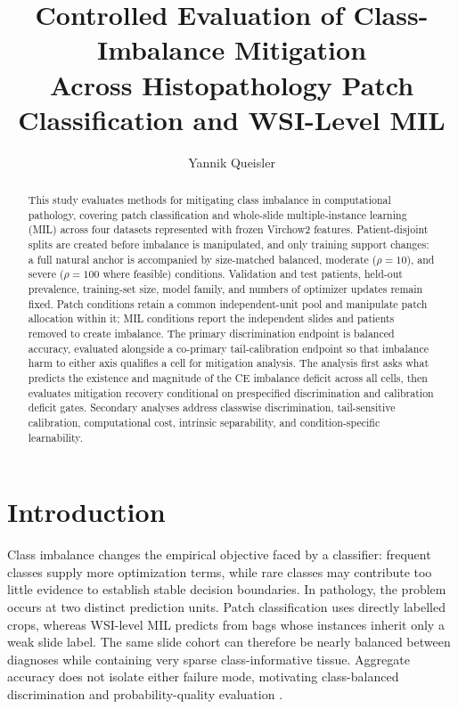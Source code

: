 \documentclass[11pt]{article}
\title{Controlled Evaluation of Class-Imbalance Mitigation\\
Across Histopathology Patch Classification and WSI-Level MIL}
\author{Yannik Queisler}
\date{}
\begin{document}
\maketitle

\begin{abstract}
\begingroup
\setlength{\emergencystretch}{2em}
\noindent This study evaluates methods for mitigating class imbalance in computational pathology, covering patch classification and whole-slide multiple-instance learning (MIL) across four datasets represented with frozen Virchow2 features. Patient-disjoint splits are created before imbalance is manipulated, and only training support changes: a full natural anchor is accompanied by size-matched balanced, moderate ($\rho=10$), and severe ($\rho=100$ where feasible) conditions. Validation and test patients, held-out prevalence, training-set size, model family, and numbers of optimizer updates remain fixed. Patch conditions retain a common independent-unit pool and manipulate patch allocation within it; MIL conditions report the independent slides and patients removed to create imbalance. The primary discrimination endpoint is balanced accuracy, evaluated alongside a co-primary tail-calibration endpoint so that imbalance harm to either axis qualifies a cell for mitigation analysis. The analysis first asks what predicts the existence and magnitude of the CE imbalance deficit across all cells, then evaluates mitigation recovery conditional on prespecified discrimination and calibration deficit gates. Secondary analyses address classwise discrimination, tail-sensitive calibration, computational cost, intrinsic separability, and condition-specific learnability.
\par
\endgroup
\end{abstract}

\setcounter{tocdepth}{2}
\tableofcontents
\clearpage

\section{Introduction}
Class imbalance changes the empirical objective faced by a classifier: frequent classes supply more optimization terms, while rare classes may contribute too little evidence to establish stable decision boundaries. In pathology, the problem occurs at two distinct prediction units. Patch classification uses directly labelled crops, whereas WSI-level MIL predicts from bags whose instances inherit only a weak slide label. The same slide cohort can therefore be nearly balanced between diagnoses while containing very sparse class-informative tissue. Aggregate accuracy does not isolate either failure mode, motivating class-balanced discrimination and probability-quality evaluation \citep{saini2023tacklingClass,zhang2023deepLong,mosquera2024classImbalance}.
\end{document}
